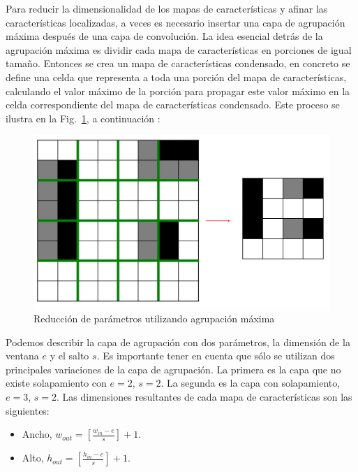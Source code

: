     Para reducir la dimensionalidad de los mapas de características y afinar las características localizadas, a veces es necesario insertar una capa de agrupación máxima después de una capa de convolución. La idea esencial detrás de la agrupación máxima es dividir cada mapa de características en porciones de igual tamaño. Entonces se crea un mapa de características condensado, en concreto se define una celda que representa a toda una porción del mapa de características, calculando el valor máximo de la porción para propagar este valor máximo en la celda correspondiente del mapa de características condensado. Este proceso se ilustra en la Fig.~\ref{fig:max_pooling}, a continuación \cite{dlBook}:
	\begin{figure}[htp]
        \centering
        \includegraphics[scale=0.4]{chapter3/max_pooling.png}
        \caption{Reducción de parámetros utilizando agrupación máxima}
        \label{fig:max_pooling}
    \end{figure}

    Podemos describir la capa de agrupación con dos parámetros, la dimensión de la ventana $e$ y el salto $s$. Es importante tener en cuenta que sólo se utilizan dos principales variaciones de la capa de agrupación. La primera es la capa que no existe solapamiento con $e=2$, $s=2$. La segunda es la capa con solapamiento, $e=3$, $s=2$. Las dimensiones resultantes de cada mapa de características son las siguientes:

    \begin{itemize}
		\item Ancho, $w_{out}=\left[\frac{w_{in}-e}{s}\right]+1$.
		\item Alto, $h_{out}=\left[\frac{h_{in}-e}{s}\right]+1$.
	\end{itemize}
	
